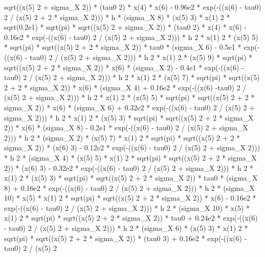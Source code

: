 \begin{maplegroup}
sqrt((x(5) 2 + sigma\_X  2)) * (tau0  2) * x(4) * x(6) - 0.96e2 * exp(-((x(6) - tau0)  2 / (x(5)  2 + 2 * sigma\_X  2))) * h * (sigma\_X  8) * (x(5)  3) * x(1)  2 * sqrt(0.2e1) * sqrt(pi) * sqrt((x(5)  2 + sigma\_X  2)) * (tau0  2) * x(4) * x(6) - 0.16e2 * exp(-((x(6) - tau0)  2 / (x(5)  2 + sigma\_X  2))) * h  2 * x(1)  2 * (x(5)  5) * sqrt(pi) * sqrt((x(5)  2 + 2 * sigma\_X  2)) * tau0 * (sigma\_X  6) - 0.5e1 * exp(-((x(6) - tau0)  2 / (x(5)  2 + sigma\_X  2))) * h  2 * x(1)  2 * (x(5)  9) * sqrt(pi) * sqrt((x(5)  2 + 2 * sigma\_X  2)) * x(6) * (sigma\_X  2) - 0.4e1 * exp(-((x(6) - tau0)  2 / (x(5)  2 + sigma\_X  2))) * h  2 * x(1)  2 * (x(5)  7) * sqrt(pi) * sqrt((x(5)  2 + 2 * sigma\_X  2)) * x(6) * (sigma\_X  4) + 0.16e2 * exp(-((x(6) -tau0)  2 / (x(5)  2 + sigma\_X  2))) * h  2 * x(1)  2 * (x(5)  5) * sqrt(pi) * sqrt((x(5)  2 + 2 * sigma\_X  2)) * x(6) * (sigma\_X  6) + 0.32e2 * exp(-((x(6) - tau0)  2 / (x(5)  2 + sigma\_X  2))) * h  2 * x(1)  2 * (x(5)  3) * sqrt(pi) * sqrt((x(5)  2 + 2 * sigma\_X  2)) * x(6) * (sigma\_X  8) - 0.2e1 * exp(-((x(6) - tau0)  2 / (x(5)  2 + sigma\_X  2))) * h  2 * (sigma\_X  2) * (x(5)  7) * x(1)  2 * sqrt(pi) * sqrt((x(5)  2 + 2 * sigma\_X  2)) * (x(6)  3) - 0.12e2 * exp(-((x(6) - tau0) 2 / (x(5)  2 + sigma\_X  2))) * h  2 * (sigma\_X  4) * (x(5)  5) * x(1)  2 * sqrt(pi) * sqrt((x(5)  2 + 2 * sigma\_X  2)) * (x(6)  3) - 0.32e2 * exp(-((x(6) - tau0)  2 / (x(5)  2 + sigma\_X  2))) * h  2 * x(1)  2 * (x(5)  3) * sqrt(pi) * sqrt((x(5)  2 + 2 * sigma\_X  2)) * tau0 * (sigma\_X  8) + 0.16e2 * exp(-((x(6) - tau0)  2 / (x(5)  2 + sigma\_X  2))) * h  2 * (sigma\_X  10) * x(5) * x(1)  2 * sqrt(pi) * sqrt((x(5)  2 + 2 * sigma\_X  2)) * x(6) - 0.16e2 * exp(-((x(6) - tau0)  2 / (x(5)  2 + sigma\_X  2))) * h  2 * (sigma\_X  10) * x(5) * x(1)  2 * sqrt(pi) * sqrt((x(5)  2 + 2 * sigma\_X  2)) * tau0 + 0.24e2 * exp(-((x(6) - tau0)  2 / (x(5)  2 + sigma\_X  2))) * h  2 * (sigma\_X  6) * (x(5)  3) * x(1)  2 * sqrt(pi) * sqrt((x(5) 2 + 2 * sigma\_X  2)) * (tau0  3) + 0.16e2 * exp(-((x(6) - tau0)  2 / (x(5)  2 
\end{maplegroup}
